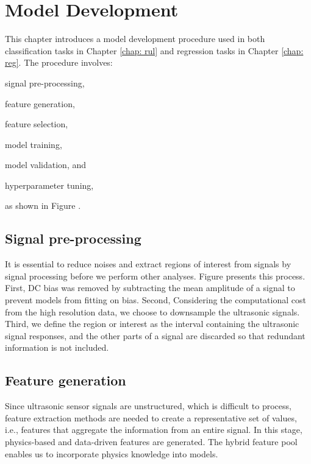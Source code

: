 \chapter{Model Development}
\label{chap: model}

This chapter introduces a model development procedure used in both classification tasks in Chapter \ref{chap: rul} and regression tasks in Chapter \ref{chap: reg}. The procedure involves:
\begin{enumerate*}[label=\itshape\alph*\upshape)]
    \item signal pre-processing,
    \item feature generation,
    \item feature selection,
    \item model training,
    \item model validation, and
    \item hyperparameter tuning,
\end{enumerate*}
as shown in Figure .

\section{Signal pre-processing}
It is essential to reduce noises and extract regions of interest from signals by signal processing before we perform other analyses. Figure presents this process. First, DC bias was removed by subtracting the mean amplitude of a signal to prevent models from fitting on bias. Second, Considering the computational cost from the high resolution data, we choose to downsample the ultrasonic signals. Third, we define the region or interest as the interval containing the ultrasonic signal responses, and the other parts of a signal are discarded so that redundant information is not included.

\section{Feature generation}
Since ultrasonic sensor signals are unstructured, which is difficult to process, feature extraction methods are needed to create a representative set of values, i.e., features that aggregate the information from an entire signal. In this stage, physics-based and data-driven features are generated. The hybrid feature pool enables us to incorporate physics knowledge into models.

